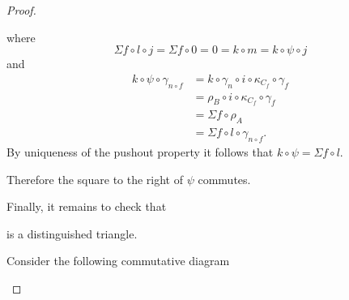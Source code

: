 \begin{proof}
\begin{enumerate}[label={(\bfseries TR\arabic*)}]
{\begin{center}
            \end{center}
            where
            \[
                \Sigma f \circ l \circ j = \Sigma f \circ 0 = 0 = k \circ m = k \circ \psi \circ j
            \]
            and
            \begin{align*}
                k \circ \psi \circ \gamma_{n \circ f} &= k \circ \gamma_n \circ i \circ \kappa_{C_f} \circ \gamma_f \\
                &= \rho_B \circ i \circ \kappa_{C_f} \circ \gamma_f \\
                &= \Sigma f \circ \rho_A \\
                &= \Sigma f \circ l \circ \gamma_{n \circ f}.
            \end{align*}
            By uniqueness of the pushout property it follows that \( k \circ \psi = \Sigma f \circ l \).
                
            Therefore the square to the right of \( \psi \) commutes.

            Finally, it remains to check that
            \begin{center}
            \end{center}
            is a distinguished triangle.

            Consider the following commutative diagram
            \begin{center}
\end{center}}
\end{enumerate}
\end{proof}
